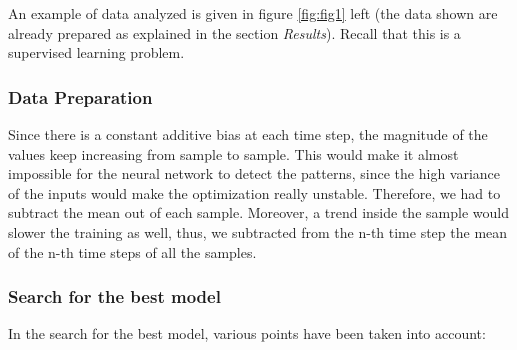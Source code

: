 \documentclass[prl, twocolumn]{revtex4-1}
\begin{document}
An example of data analyzed is given in figure \ref{fig:fig1} left (the data shown are already prepared as explained in the section \textit{Results}). Recall that this is a supervised learning problem.

\subsubsection{Data Preparation}

Since there is a constant additive bias at each time step, the magnitude of the values keep increasing from sample to sample. This would make it almost impossible for the neural network to detect the patterns, since the high variance of the inputs would make the optimization really unstable. Therefore, we had to subtract the mean out of each sample. Moreover, a trend inside the sample would slower the training as well, thus, we subtracted from the n-th time step the mean of the n-th time steps of all the samples.

\subsubsection{Search for the best model}



In the search for the best model, various points have been taken into account:
\end{document}
